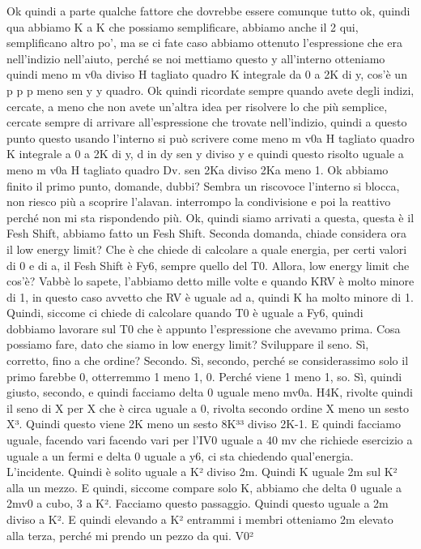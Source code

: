 {\begin{soluzione}
   Ok quindi a parte qualche fattore che dovrebbe essere comunque tutto ok, quindi qua abbiamo K a K che possiamo semplificare, abbiamo anche il 2 qui, semplificano altro po', ma se ci fate caso abbiamo ottenuto l'espressione che era nell'indizio nell'aiuto, perché se noi mettiamo questo y all'interno otteniamo quindi meno m v0a diviso H tagliato quadro K integrale da 0 a 2K di y, cos'è un p p p meno sen y y quadro. Ok quindi ricordate sempre quando avete degli indizi, cercate, a meno che non avete un'altra idea per risolvere lo che più semplice, cercate sempre di arrivare all'espressione che trovate nell'indizio, quindi a questo punto questo usando l'interno si può scrivere come meno m v0a H tagliato quadro K integrale a 0 a 2K di y, d in dy sen y diviso y e quindi questo risolto uguale a meno m v0a H tagliato quadro Dv. sen 2Ka diviso 2Ka meno 1. Ok abbiamo finito il primo punto, domande, dubbi? Sembra un riscovoce l'interno si blocca, non riesco più a scoprire l'alavan. interrompo la condivisione e poi la reattivo perché non mi sta rispondendo più. Ok, quindi siamo arrivati a questa, questa è il Fesh Shift, abbiamo fatto un Fesh Shift. Seconda domanda, chiade considera ora il low energy limit? Che è che chiede di calcolare a quale energia, per certi valori di 0 e di a, il Fesh Shift è Fy6, sempre quello del T0. Allora, low energy limit che cos'è? Vabbè lo sapete, l'abbiamo detto mille volte e quando KRV è molto minore di 1, in questo caso avvetto che RV è uguale ad a, quindi K ha molto minore di 1. Quindi, siccome ci chiede di calcolare quando T0 è uguale a Fy6, quindi dobbiamo lavorare sul T0 che è appunto l'espressione che avevamo prima. Cosa possiamo fare, dato che siamo in low energy limit? Sviluppare il seno. Sì, corretto, fino a che ordine? Secondo. Sì, secondo, perché se considerassimo solo il primo farebbe 0, otterremmo 1 meno 1, 0. Perché viene 1 meno 1, so. Sì, quindi giusto, secondo, e quindi facciamo delta 0 uguale meno mv0a. H4K, rivolte quindi il seno di X per X che è circa uguale a 0, rivolta secondo ordine X meno un sesto X³. Quindi questo viene 2K meno un sesto 8K³³ diviso 2K-1. E quindi facciamo uguale, facendo vari facendo vari per l'IV0 uguale a 40 mv che richiede esercizio a uguale a un fermi e delta 0 uguale a y6, ci sta chiedendo qual'energia. L'incidente. Quindi è solito uguale a K² diviso 2m. Quindi K uguale 2m sul K² alla un mezzo. E quindi, siccome compare solo K, abbiamo che delta 0 uguale a 2mv0 a cubo, 3 a K². Facciamo questo passaggio. Quindi questo uguale a 2m diviso a K². E quindi elevando a K² entrammi i membri otteniamo 2m elevato alla terza, perché mi prendo un pezzo da qui. V0²
   

\end{soluzione}}

